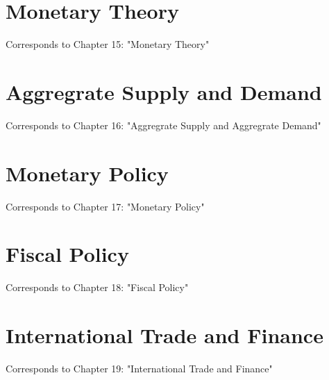 \documentclass[12pt, a4paper]{article}
\theoremstyle{definition}
\begin{document}
\newpage

\section{Monetary Theory}
Corresponds to Chapter 15: "Monetary Theory"

\newpage

\section{Aggregrate Supply and Demand}
Corresponds to Chapter 16: "Aggregrate Supply and Aggregrate Demand"

\newpage

\section{Monetary Policy}
Corresponds to Chapter 17: "Monetary Policy"

\newpage

\section{Fiscal Policy}
Corresponds to Chapter 18: "Fiscal Policy"

\newpage

\section{International Trade and Finance}
Corresponds to Chapter 19: "International Trade and Finance"

\newpage
\end{document}
